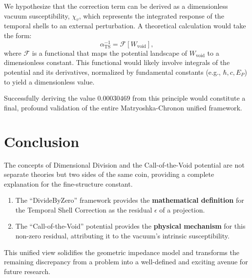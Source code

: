 \documentclass[11pt,a4paper]{article}
\begin{document}
We hypothesize that the correction term can be derived as a dimensionless vacuum susceptibility, $\chi_v$, which represents the integrated response of the temporal shells to an external perturbation. A theoretical calculation would take the form:
\begin{equation}
    \alpha^{-1}_{\text{TS}} = \mathcal{F}[W_{\text{void}}],
\end{equation}
where $\mathcal{F}$ is a functional that maps the potential landscape of $W_{\text{void}}$ to a dimensionless constant. This functional would likely involve integrals of the potential and its derivatives, normalized by fundamental constants (e.g., $\hbar, c, E_P$) to yield a dimensionless value.

Successfully deriving the value $0.00030469$ from this principle would constitute a final, profound validation of the entire Matryoshka-Chronon unified framework.

\section{Conclusion}
The concepts of Dimensional Division and the Call-of-the-Void potential are not separate theories but two sides of the same coin, providing a complete explanation for the fine-structure constant.
\begin{enumerate}
    \item The ``DivideByZero'' framework provides the \textbf{mathematical definition} for the Temporal Shell Correction as the residual $\epsilon$ of a projection.
    \item The ``Call-of-the-Void'' potential provides the \textbf{physical mechanism} for this non-zero residual, attributing it to the vacuum's intrinsic susceptibility.
\end{enumerate}
This unified view solidifies the geometric impedance model and transforms the remaining discrepancy from a problem into a well-defined and exciting avenue for future research.
\end{document}
